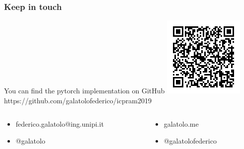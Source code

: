 \documentclass{beamer}
\begin{document}
\begin{frame}
    \frametitle{Keep in touch}
    \begin{center}
        \large You can find the pytorch implementation on GitHub
        \includegraphics[width=.30\textwidth]{img/qr.png} \\
        \small https://github.com/galatolofederico/icpram2019
    \end{center}
    \begin{columns}
        \begin{column}{.5\textwidth}
            \begin{itemize}
                \item [\faEnvelope] federico.galatolo@ing.unipi.it
                \item [\faPaperPlane] @galatolo
            \end{itemize}
        \end{column}
        \begin{column}{.5\textwidth}
            \begin{itemize}
                \item [\faGlobe] galatolo.me
                \item [\faGithub] @galatolofederico
            \end{itemize}
        \end{column}
    \end{columns}
\end{frame}
\end{document}
